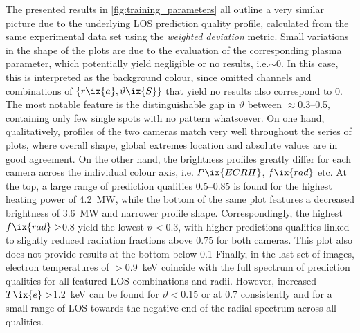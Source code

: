         The presented results in \cref{fig:training_parameters} all outline a very similar picture due to the underlying LOS prediction quality profile, calculated from the same experimental data set using the \textit{weighted deviation} metric. Small variations in the shape of the plots are due to the evaluation of the corresponding plasma parameter, which potentially yield negligible or no results, i.e.$\sim0$. In this case, this is interpreted as the background colour, since omitted channels and combinations of $\left\{r\ix{a}, \vartheta\ix{S}\right\}$ that yield no results also correspond to $0$. The most notable feature is the distinguishable gap in $\vartheta$ between $\approx$\SIrange{0.3}{0.5}{\arbitraryunit}, containing only few single spots with no pattern whatsoever. On one hand, qualitatively, profiles of the two cameras match very well throughout the series of plots, where overall shape, global extremes location and absolute values are in good agreement. On the other hand, the brightness profiles greatly differ for each camera across the individual colour axis, i.e. $P\ix{ECRH}$, $f\ix{rad}$ etc. At the top, a large range of prediction qualities \SIrange{0.5}{0.85}{\arbitraryunit} is found for the highest heating power of \SI{4.2}{\mega\watt}, while the bottom of the same plot features a decreased brightness of \SI{3.6}{\mega\watt} and narrower profile shape. Correspondingly, the highest $f\ix{rad}>$\SI{0.8}{\arbitraryunit} yield the lowest $\vartheta<$\SI{0.3}{\arbitraryunit}, with higher predictions qualities linked to slightly reduced radiation fractions above \SI{0.75}{\arbitraryunit} for both cameras. This plot also does not provide results at the bottom below \SI{0.1}{\arbitraryunit} Finally, in the last set of images, electron temperatures of $>$\SI{0.9}{\kilo\electronvolt} coincide with the full spectrum of prediction qualities for all featured LOS combinations and radii. However, increased $T\ix{e}>$\SI{1.2}{\kilo\electronvolt} can be found for $\vartheta<$\SI{0.15}{\arbitraryunit} or at \SI{0.7}{\arbitraryunit} consistently and for a small range of LOS towards the negative end of the radial spectrum across all qualities.\\%
